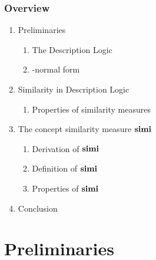 \documentclass[smaller]{beamer}
\begin{document}
\begin{frame}
  \frametitle{Overview}
  \begin{enumerate}
    \item Preliminaries
    \begin{enumerate}
      \item The \elh Description Logic
      \item \elh-normal form
    \end{enumerate}
    \item Similarity in Description Logic
    \begin{enumerate}
      \item Properties of similarity measures
    \end{enumerate}
    \item The concept similarity measure \(\operatorname{\mathbf{simi}}\)
    \begin{enumerate}
      \item Derivation of \(\operatorname{\mathbf{simi}}\)
      \item Definition of \(\operatorname{\mathbf{simi}}\)
      \item Properties of \(\operatorname{\mathbf{simi}}\)
    \end{enumerate}
    \item Conclusion
  \end{enumerate}
\end{frame}

\section{Preliminaries}
\end{document}
